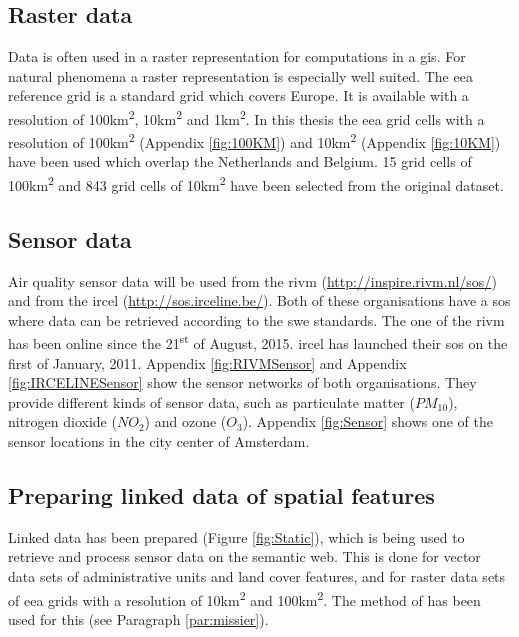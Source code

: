 \subsection{Raster data}
Data is often used in a raster representation for computations in a \ac{gis}. For natural phenomena a raster representation is especially well suited. The \ac{eea} reference grid is a standard grid which covers Europe. It is available with a resolution of 100km\textsuperscript{2}, 10km\textsuperscript{2} and 1km\textsuperscript{2}. In this thesis the \ac{eea} grid cells with a resolution of 100km\textsuperscript{2} (Appendix \ref{fig:100KM}) and 10km\textsuperscript{2} (Appendix \ref{fig:10KM}) have been used which overlap the Netherlands and Belgium. 15 grid cells of 100km\textsuperscript{2} and 843 grid cells of 10km\textsuperscript{2} have been selected from the original dataset.  

\subsection{Sensor data}
\begin{sloppypar}
Air quality sensor data will be used from the \ac{rivm} (\url{http://inspire.rivm.nl/sos/}) and from the \ac{ircel} (\url{http://sos.irceline.be/}). Both of these organisations have a \ac{sos} where data can be retrieved according to the \ac{swe} standards. The one of the \ac{rivm} has been online since the 21\textsuperscript{st} of August, 2015. \ac{ircel} has launched their \ac{sos} on the first of January, 2011. Appendix \ref{fig:RIVMSensor} and Appendix \ref{fig:IRCELINESensor} show the sensor networks of both organisations. They provide different kinds of sensor data, such as particulate matter ($PM_{10}$), nitrogen dioxide ($NO_{2}$) and ozone ($O_{3}$). Appendix \ref{fig:Sensor} shows one of the sensor locations in the city center of Amsterdam. 
\end{sloppypar}

\subsection{Preparing linked data of spatial features}
Linked data has been prepared (Figure \ref{fig:Static}), which is being used to retrieve and process sensor data on the semantic web. This is done for vector data sets of administrative units and land cover features, and for raster data sets of \ac{eea} grids with a resolution of 10km\textsuperscript{2} and 100km\textsuperscript{2}. The method of \cite{LD:Missier} has been used for this (see Paragraph \ref{par:missier}).

